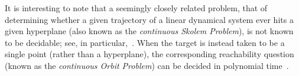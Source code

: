 It is interesting to note that a seemingly closely related problem,
that of determining whether a given trajectory of a linear dynamical
system ever hits a given hyperplane (also known as the
\emph{continuous Skolem Problem}), is not known to be decidable; see,
in particular,~\cite{ContinuousSkolem,ContinuousSkolem3,COW16b:LICS16}. When the
target is instead taken to be a single point (rather than a
hyperplane), the corresponding reachability question (known as the
\emph{continuous Orbit Problem}) can be decided in polynomial
time~\cite{Hainry08}.

